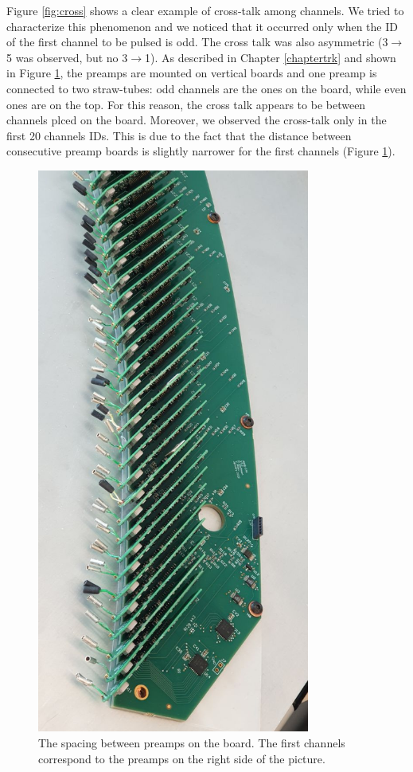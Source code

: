 Figure \ref{fig:cross} shows a clear example of cross-talk among channels. 
We tried to characterize this phenomenon and we noticed that it occurred 
only when the ID of the first channel to be pulsed is odd.
The cross talk was also asymmetric (3$\rightarrow$5 was observed, 
but no 3$\rightarrow$1).
As described in Chapter \ref{chaptertrk} and shown in Figure \ref{fig:spacepreamps}, 
the preamps are mounted on vertical boards and one preamp is 
connected to two straw-tubes: odd channels are the ones on the board, 
while even ones are on the top. For this reason, the cross talk 
appears to be between channels plced on the board. 
Moreover, we observed the cross-talk only in the first 20 channels IDs.
This is due to the fact that the distance between consecutive preamp 
boards is slightly narrower for the first channels (Figure \ref{fig:spacepreamps}).
\begin{figure}[!h]
  \centering
  \includegraphics[angle=90,width=0.8\textwidth]{figures/jpg/photo_6028424923279639562_y.jpg}
  \caption{The spacing between preamps on the board. The first channels correspond to the preamps on the right side of the picture.}
 \label{fig:spacepreamps}
\end{figure}
